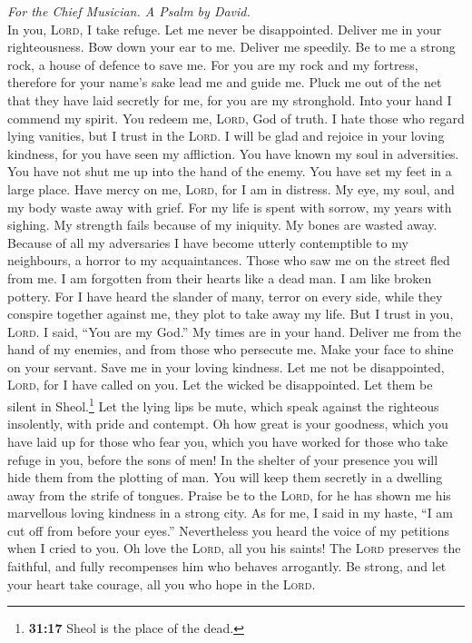 \emph{For the Chief Musician. A Psalm by David.}\\
 In you, \textsc{Lord}, I take refuge. Let me never be
disappointed. Deliver me in your righteousness.  Bow down
your ear to me. Deliver me speedily. Be to me a strong rock, a house of
defence to save me.  For you are my rock and my fortress,
therefore for your name's sake lead me and guide me. 
Pluck me out of the net that they have laid secretly for me, for you are
my stronghold.  Into your hand I commend my spirit. You
redeem me, \textsc{Lord}, God of truth.  I hate those who
regard lying vanities, but I trust in the \textsc{Lord}. 
I will be glad and rejoice in your loving kindness, for you have seen my
affliction. You have known my soul in adversities.  You
have not shut me up into the hand of the enemy. You have set my feet in
a large place.  Have mercy on me, \textsc{Lord}, for I am
in distress. My eye, my soul, and my body waste away with grief.
 For my life is spent with sorrow, my years with sighing.
My strength fails because of my iniquity. My bones are wasted away.
 Because of all my adversaries I have become utterly
contemptible to my neighbours, a horror to my acquaintances. Those who
saw me on the street fled from me.  I am forgotten from
their hearts like a dead man. I am like broken pottery. 
For I have heard the slander of many, terror on every side, while they
conspire together against me, they plot to take away my life.
 But I trust in you, \textsc{Lord}. I said, ``You are my
God.''  My times are in your hand. Deliver me from the
hand of my enemies, and from those who persecute me. 
Make your face to shine on your servant. Save me in your loving
kindness.  Let me not be disappointed, \textsc{Lord}, for
I have called on you. Let the wicked be disappointed. Let them be silent
in Sheol.\footnote{\textbf{31:17} Sheol is the place of the dead.}
 Let the lying lips be mute, which speak against the
righteous insolently, with pride and contempt.  Oh how
great is your goodness, which you have laid up for those who fear you,
which you have worked for those who take refuge in you, before the sons
of men!  In the shelter of your presence you will hide
them from the plotting of man. You will keep them secretly in a dwelling
away from the strife of tongues.  Praise be to the
\textsc{Lord}, for he has shown me his marvellous loving kindness in a
strong city.  As for me, I said in my haste, ``I am cut
off from before your eyes.'' Nevertheless you heard the voice of my
petitions when I cried to you.  Oh love the
\textsc{Lord}, all you his saints! The \textsc{Lord} preserves the
faithful, and fully recompenses him who behaves arrogantly.
 Be strong, and let your heart take courage, all you who
hope in the \textsc{Lord}.

